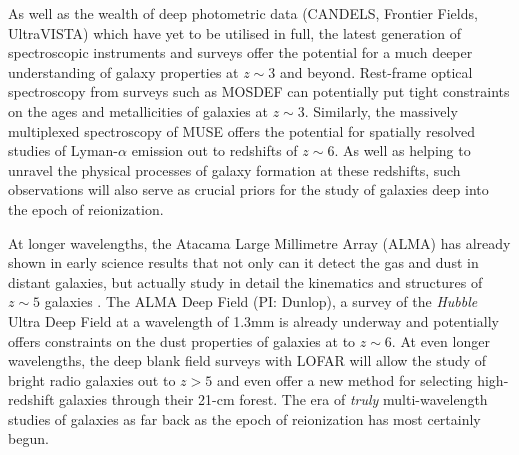 As well as the wealth of deep photometric data (CANDELS, Frontier Fields, UltraVISTA) which have yet to be utilised in full, the latest generation of spectroscopic instruments and surveys offer the potential for a much deeper understanding of galaxy properties at $z\sim3$ and beyond. Rest-frame optical spectroscopy from surveys such as MOSDEF \citep{Kriek:2014uw} can potentially put tight constraints on the ages and metallicities of galaxies at $z\sim3$. Similarly, the massively multiplexed spectroscopy of MUSE \citep{Bacon:2015eh} offers the potential for spatially resolved studies of Lyman-$\alpha$ emission out to redshifts of $z\sim6$. As well as helping to unravel the physical processes of galaxy formation at these redshifts, such observations will also serve as crucial priors for the study of galaxies deep into the epoch of reionization.

At longer wavelengths, the Atacama Large Millimetre Array (ALMA) has already shown in early science results that not only can it detect the gas and dust in distant galaxies, but actually study in detail the kinematics and structures of $z\sim5$ galaxies \citep{DeBreuck:2014eo}. The ALMA Deep Field (PI: Dunlop), a survey of the \emph{Hubble} Ultra Deep Field at a wavelength of 1.3mm is already underway and potentially offers constraints on the dust properties of galaxies at to $z\sim6$. At even longer wavelengths, the deep blank field surveys with LOFAR will allow the study of bright radio galaxies out to $z>5$ and even offer a new method for selecting high-redshift galaxies through their 21-cm forest. The era of \emph{truly} multi-wavelength studies of galaxies as far back as the epoch of reionization has most certainly begun.
